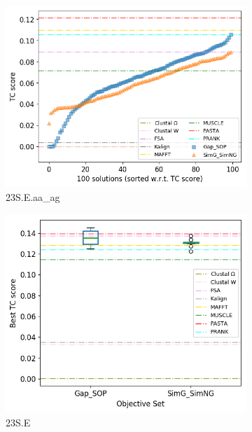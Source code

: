 \begin{figure}[!htbp]
\begin{adjustwidth}{-0.2cm}{}
\begin{subfigure}{0.5\columnwidth}
			\includegraphics[width=\columnwidth]{Figure/summary/precomputedInit/23S.E.aa_ag/tc_density_single_run}
			\caption{23S.E.aa\_ag}
		\end{subfigure}
		\begin{subfigure}{0.5\columnwidth}
			\includegraphics[width=\columnwidth]{Figure/summary/precomputedInit/23S.E/objset_tc_rank}
			\caption{23S.E}
		\end{subfigure}	
		\begin{subfigure}{0.5\columnwidth}

\end{subfigure}
\end{adjustwidth}
\end{figure}
